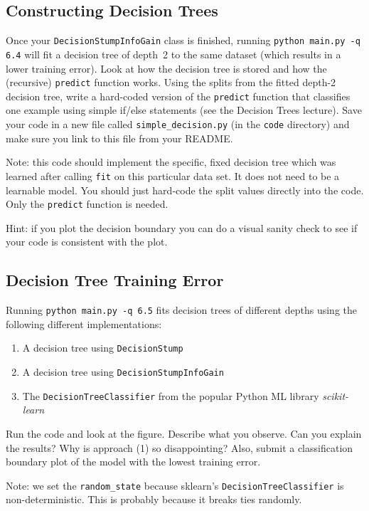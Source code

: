 \documentclass{article}
\def\blu#1{{\color{blu}#1}}
\def\enum#1{\begin{enumerate}#1\end{enumerate}}
\begin{document}
\subsection{Constructing Decision Trees}

Once your \texttt{DecisionStumpInfoGain} class is finished, running \texttt{python main.py -q 6.4} will fit
a decision tree of depth~2 to the same dataset (which results in a lower training error).
Look at how the decision tree is stored and how the (recursive) \texttt{predict} function works.
\blu{Using the splits from the fitted depth-2 decision tree, write a hard-coded version of the \texttt{predict}
function that classifies one example using simple if/else statements
(see the Decision Trees lecture).} Save your code in a new file called
\texttt{simple\string_decision.py} (in the \texttt{code} directory) and make sure you link to this file from your README.

Note: this code should implement the specific, fixed decision tree
which was learned after calling \texttt{fit} on this particular data set. It does not need to be a learnable model.
You should just hard-code the split values directly into the code. Only the \texttt{predict} function is needed.

Hint: if you plot the decision boundary you can do a visual sanity check to see if your code is consistent with the plot.





\subsection{Decision Tree Training Error}

Running \texttt{python main.py -q 6.5} fits decision trees of different depths using the following different implementations: 
\enum{
\item A decision tree using \texttt{DecisionStump}
\item A decision tree using \texttt{DecisionStumpInfoGain}
\item The \texttt{DecisionTreeClassifier} from the popular Python ML library \emph{scikit-learn}
}

Run the code and look at the figure.
\blu{Describe what you observe. Can you explain the results?} Why is approach (1) so disappointing? Also, \blu{submit a classification boundary plot of the model with the lowest training error}.

Note: we set the \verb|random_state| because sklearn's \texttt{DecisionTreeClassifier} is non-deterministic. This is probably
because it breaks ties randomly.
\end{document}
